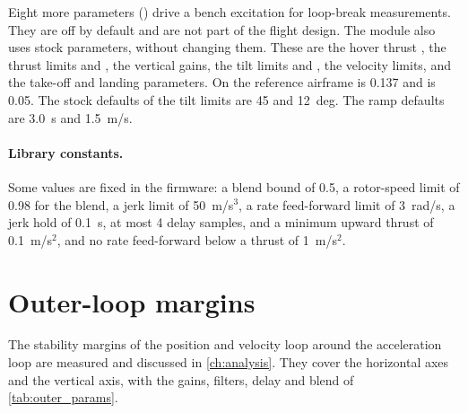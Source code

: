 Eight more parameters () drive a bench excitation for loop-break measurements.
They are off by default and are not part of the flight design.
The module also uses stock parameters, without changing them.
These are the hover thrust , the thrust limits  and , the vertical gains, the tilt limits  and , the velocity limits, and the take-off and landing parameters.
On the reference airframe  is 0.137 and  is 0.05.
The stock defaults of the tilt limits are 45 and 12~deg.
The ramp defaults are 3.0~s and 1.5~m/s.

\paragraph{Library constants.}
Some values are fixed in the firmware: a blend bound of 0.5, a rotor-speed limit of 0.98 for the blend, a jerk limit of 50~m/s$^3$, a rate feed-forward limit of 3~rad/s, a jerk hold of 0.1~s, at most 4 delay samples, and a minimum upward thrust of 0.1~m/s$^2$, and no rate feed-forward below a thrust of 1~m/s$^2$.

\section{Outer-loop margins}\label{sec:outer_margins}

The stability margins of the position and velocity loop around the acceleration loop are measured and discussed in \cref{ch:analysis}.
They cover the horizontal axes and the vertical axis, with the gains, filters, delay and blend of \cref{tab:outer_params}.
